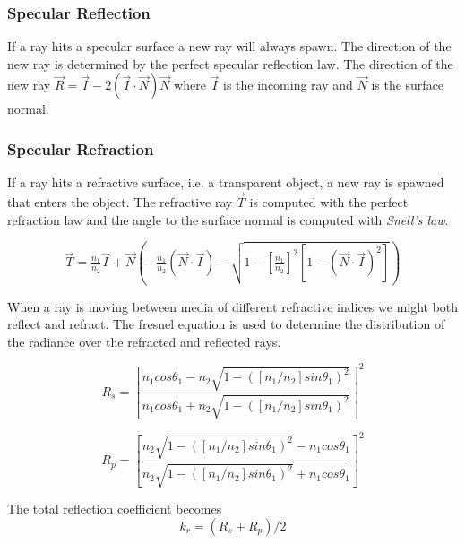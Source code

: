 \documentclass[a4paper, twocolumn]{article}
\begin{document}
            \subsubsection{Specular Reflection} \label{sec:specular_reflection}
            If a ray hits a specular surface a new ray will always spawn. The direction of the new ray is determined by the perfect specular reflection law. The direction of the new ray $\vec{R} = \vec{I} - 2 (\vec{I} \cdot \vec{N}) \vec{N}$ where $\vec{I}$ is the incoming ray and $\vec{N}$ is the surface normal.

            \subsubsection{Specular Refraction} \label{sec:specular_refraction}
            If a ray hits a refractive surface, i.e. a transparent object, a new ray is spawned that enters the object.
            The refractive ray $\vec{T}$ is computed with the perfect refraction law and the angle to the surface normal is computed with \emph{Snell's law}.

            \small
            \begin{equation*}
              \vec{T} = \tfrac{n_1}{n_2}\vec{I} + \vec{N}\left(-\tfrac{n_1}{n_2}(\vec{N}\cdot\vec{I}) - \sqrt{1 - [\tfrac{n_1}{n_2}]^2[1 - (\vec{N}\cdot\vec{I})^2]}\right)
            \end{equation*}
            \normalsize

            When a ray is moving between media of different refractive indices we might both reflect and refract. The fresnel equation is used to determine the distribution of the radiance over the refracted and reflected rays.

            \begin{equation*}
            R_s = \left[\frac{n_1cos\theta_1 - n_2\sqrt{1-([n_1/n_2]sin\theta_1)^2}}{n_1cos\theta_1 + n_2\sqrt{1-([n_1/n_2]sin\theta_1)^2}}\right]^2
          \end{equation*}

          \begin{equation*}
            R_p = \left[\frac{n_2\sqrt{1-([n_1/n_2]sin\theta_1)^2} - n_1cos\theta_1}{n_2\sqrt{1-([n_1/n_2]sin\theta_1)^2} + n_1cos\theta_1}\right]^2
          \end{equation*}

          The total reflection coefficient becomes
          \begin{equation*}
            k_r = (R_s + R_p)/2
          \end{equation*}
\end{document}
